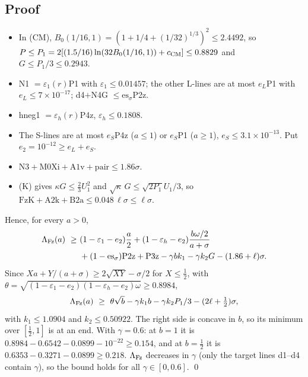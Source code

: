 \subsection{Proof}

\begin{itemize}
\item[(F1$'$)] In (CM), $B_0(1/16,1)=(1+1/4+(1/32)^{1/3})^2\le2.4492$, so $P\le P_1=2[(1.5/16)\ln(32B_0(1/16,1))+c_{\rm CM}]\le0.8829$ and $G\le P_1/3\le0.2943$.
\item[(R1$'$)] N1 $=\varepsilon_1(r)$P1 with $\varepsilon_1\le0.01457$; the other L-lines are at most $e_L$P1 with $e_L\le7\times10^{-17}$; d4$+$N4G $\le\mathrm{es}_\sigma$P2z.
\item[(R2$'$)] hneg1 $=\varepsilon_h(r)$P4z, $\varepsilon_h\le0.1808$.
\item[(R3$'$)] The S-lines are at most $e_S$P4z ($a\le1$) or $e_S$P1 ($a\ge1$), $e_S\le3.1\times10^{-13}$. Put $e_2=10^{-12}\ge e_L+e_S$.
\item[(R4$'$)] $\mathrm{N3}+\mathrm{M0Xi}+\mathrm{A1v}+\mathrm{pair}\le1.86\sigma$.
\item[(R5$'$)] (K) gives $\kappa G\le\tfrac23U_1^2$ and $\sqrt\kappa\,G\le\sqrt{2P_1}U_1/3$, so $\mathrm{FzK}+\mathrm{A2k}+\mathrm{B2a}\le0.048\,\ell\sigma\le\ell\sigma$.
\end{itemize}
Hence, for every $a>0$,
\begin{equation}
\begin{split}
\Lambda_{\rm Fz}(a)\ \ge\ &(1-\varepsilon_1-e_2)\frac a2+(1-\varepsilon_h-e_2)\frac{b\omega/2}{a+\sigma}\\&+(1-\mathrm{es}_\sigma)\mathrm{P2z}+\mathrm{P3z}-\gamma bk_1-\gamma k_2G-(1.86+\ell)\sigma .
\end{split}
\end{equation}
Since $Xa+Y/(a+\sigma)\ge2\sqrt{XY}-\sigma/2$ for $X\le\tfrac12$, with $\theta=\sqrt{(1-\varepsilon_1-e_2)(1-\varepsilon_h-e_2)\omega}\ge0.8984$,
\begin{equation}
\Lambda_{\rm Fz}(a)\ \ge\ \theta\sqrt b-\gamma k_1b-\gamma k_2P_1/3-(2\ell+\tfrac12)\sigma,
\end{equation}
with $k_1\le1.0904$ and $k_2\le0.50922$.
The right side is concave in $b$, so its minimum over $[\tfrac12,1]$ is at an end.
With $\gamma=0.6$: at $b=1$ it is $0.8984-0.6542-0.0899-10^{-22}\ge0.154$, and at $b=\tfrac12$ it is $0.6353-0.3271-0.0899\ge0.218$.
$\Lambda_{\rm Fz}$ decreases in $\gamma$ (only the target lines d1--d4 contain $\gamma$), so the bound holds for all $\gamma\in[0,0.6]$.
\qed

